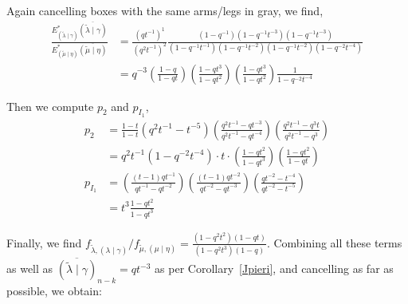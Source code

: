 \documentclass[ALCO]{cedram}
\newcommand{\Estar}[1]{E^*_{#1}}
\newcommand{\nudom}{{( \lambda \mid \gamma )}}
\newcommand{\lambdagamma}{{\nudom}}
\newcommand{\mueta}{{(\mu \mid \eta)}}
\newcommand{\mutilde}{{\widetilde{\mu}}}
\newcommand{\lambdatilde}{{\widetilde{\lambda}}}
\newcommand{\lambdatildegamma}{{(\lambdatilde \mid \gamma)}}
\newcommand{\mutildeeta}{{(\mutilde \mid \eta)}}
\begin{document}
\begin{exam}
\begin{center}

\end{center}

Again cancelling boxes with the same arms/legs in gray, we find,
\begin{align*} \frac{\Estar{\lambdatildegamma}\overline{\lambdatildegamma}}{\Estar{\mutildeeta}\overline{\mutildeeta}} &= \frac{(qt^{-1})^1}{(q^2t^{-1})^2} \frac{(1-q^{-1}) (1-q^{-1}t^{-3})(1-q^{-1}t^{-3})}{(1-q^{-1}t^{-1})(1-q^{-1}t^{-2})(1-q^{-1}t^{-2})(1-q^{-2}t^{-4})}\\
&= q^{-3} \left( \frac{1-q}{1-qt}\right) \left( \frac{1-qt^3}{1-qt^2}\right) \left( \frac{1-qt^3}{1-qt^2} \right) \frac{1}{1-q^{-2}t^{-4}}\end{align*}

Then we compute $p_2$ and $p_{I_1}$,
\begin{align*}
    p_2 &= \frac{1-t}{1-t} (q^2t^{-1} - t^{-5}) \left( \frac{q^2t^{-1} - qt^{-3}}{q^2t^{-1} - qt^{-4}} \right) \left( \frac{q^2t^{-1}-q^3t}{q^2t^{-1} - q^3}\right)\\
    &= q^2t^{-1} (1-q^{-2}t^{-4})\cdot t \cdot \left( \frac{1-qt^2}{1-qt^3} \right) \left( \frac{1-qt^2}{1-qt} \right)\\
    p_{I_1} &= \left(\frac{(t-1)qt^{-1}}{qt^{-1} - qt^{-2}} \right) \left(\frac{(t-1) qt^{-2}}{qt^{-2}-qt^{-3}} \right) \left( \frac{ qt^{-2}-t^{-4}}{qt^{-2} - t^{-5}}\right)\\
    &= t^3 \frac{1-qt^2}{1-qt^3}
\end{align*}

Finally, we find $f_{\lambdatilde, \lambdagamma} / f_{\mutilde, \mueta} = \frac{(1-q^2t^2)(1-qt)}{(1-q^2t^3)(1-q)}$. Combining all these terms as well as $\overline{\lambdatildegamma}_{n-k} = qt^{-3}$ as per Corollary~\ref{Jpieri}, and cancelling as far as possible, we obtain:


\end{exam}
\end{document}
